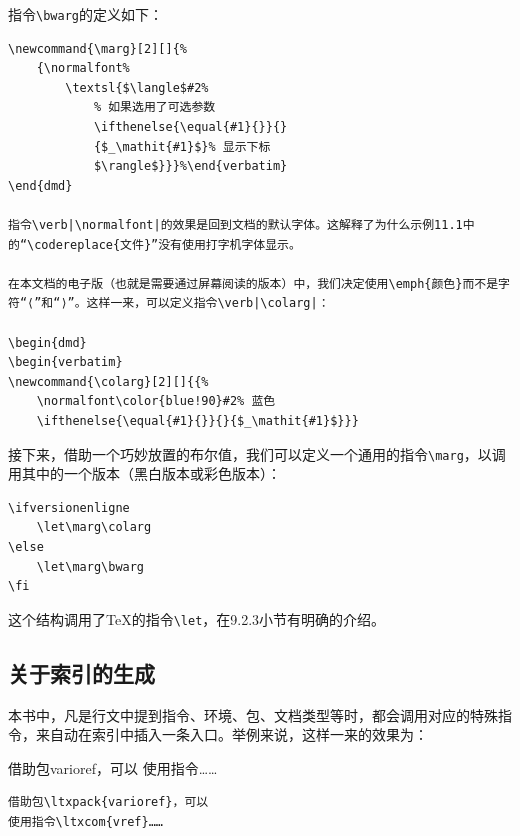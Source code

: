 指令\verb|\bwarg|的定义如下：

\begin{dmd}
\begin{verbatim}
\newcommand{\marg}[2][]{% 
    {\normalfont%
        \textsl{$\langle$#2%
            % 如果选用了可选参数 
            \ifthenelse{\equal{#1}{}}{} 
            {$_\mathit{#1}$}% 显示下标
            $\rangle$}}}%\end{verbatim}
\end{dmd}

指令\verb|\normalfont|的效果是回到文档的默认字体。这解释了为什么示例11.1中的“\codereplace{文件}”没有使用打字机字体显示。

在本文档的电子版（也就是需要通过屏幕阅读的版本）中，我们决定使用\emph{颜色}而不是字符“⟨”和“⟩”。这样一来，可以定义指令\verb|\colarg|：

\begin{dmd}
\begin{verbatim}
\newcommand{\colarg}[2][]{{% 
    \normalfont\color{blue!90}#2% 蓝色 
    \ifthenelse{\equal{#1}{}}{}{$_\mathit{#1}$}}}\end{verbatim}
\end{dmd}

接下来，借助一个巧妙放置的布尔值，我们可以定义一个通用的指令\verb|\marg|，以调用其中的一个版本（黑白版本或彩色版本）：

\begin{dmd}
\begin{verbatim}
\ifversionenligne
    \let\marg\colarg
\else
    \let\marg\bwarg
\fi\end{verbatim}
\end{dmd}

这个结构调用了\TeX 的指令\verb|\let|，在9.2.3小节有明确的介绍。

\subsection{关于索引的生成}

本书中，凡是行文中提到指令、环境、包、文档类型等时，都会调用对应的特殊指令，来自动在索引中插入一条入口。举例来说，这样一来的效果为：

\begin{codelist}[11.3]{
借助包\textsf{varioref}，可以
使用指令……
}
\begin{verbatim}
借助包\ltxpack{varioref}，可以
使用指令\ltxcom{vref}……\end{verbatim}
\end{codelist}

